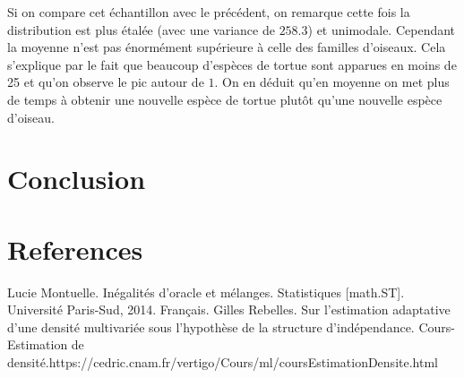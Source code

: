 \documentclass[
]{book}
\begin{document}
Si on compare cet échantillon avec le précédent, on remarque cette fois la distribution est plus étalée (avec une variance de \(258.3\)) et unimodale. Cependant la moyenne n'est pas énormément supérieure à celle des familles d'oiseaux. Cela s'explique par le fait que beaucoup d'espèces de tortue sont apparues en moins de 25 et qu'on observe le pic autour de \(1\).
On en déduit qu'en moyenne on met plus de temps à obtenir une nouvelle espèce de tortue plutôt qu'une nouvelle espèce d'oiseau.

\hypertarget{conclusion}{%
\chapter{Conclusion}\label{conclusion}}

\hypertarget{references}{%
\chapter{References}\label{references}}

Lucie Montuelle. Inégalités d'oracle et mélanges. Statistiques {[}math.ST{]}. Université Paris-Sud, 2014.
Français.\newline
Gilles Rebelles. Sur l'estimation adaptative d'une densité multivariée sous l'hypothèse de la structure d'indépendance.\newline
Cours-Estimation de densité.https://cedric.cnam.fr/vertigo/Cours/ml/coursEstimationDensite.html \newline

\begin{thebibliography}{99}
  

\end{thebibliography}
\end{document}
